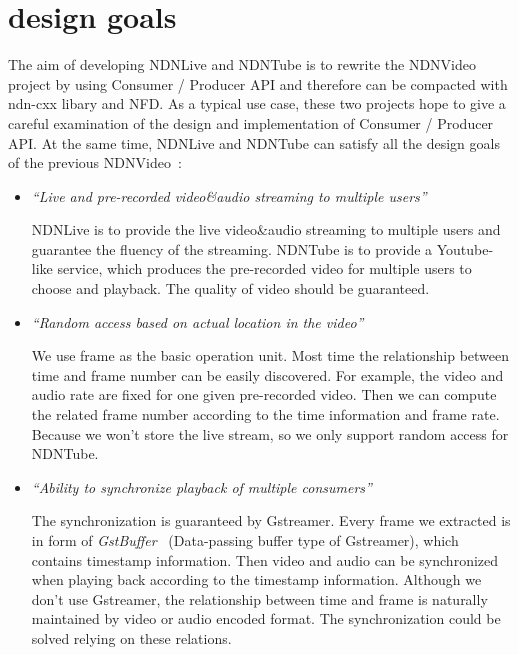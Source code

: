 \vspace{0.3cm}
\section{design goals} %
\label{sec:design_goals}
The aim of developing NDNLive and NDNTube is to rewrite the NDNVideo project by using Consumer / Producer API and therefore can be compacted with ndn-cxx libary\cite{ndn-cxx} and NFD\cite{nfd-guide}. As a typical use case, these two projects hope to give a careful examination of the design and implementation of Consumer / Producer API. At the same time, NDNLive and NDNTube can satisfy all the design goals of the previous NDNVideo~\cite{ndnvideo}:

\begin{itemize}
\item{\textit{``Live and pre-recorded video\&audio streaming to multiple users''}}

NDNLive is to provide the live video\&audio streaming to multiple users and guarantee the fluency of the streaming. NDNTube is to provide a Youtube-like service, which produces the pre-recorded video for multiple users to choose and playback. The quality of video should be guaranteed.

\item{\textit{``Random access based on actual location in the video''}}

We use frame as the basic operation unit. Most time the relationship between time and frame number can be easily discovered. For example, the video and audio rate are fixed for one given pre-recorded video. Then we can compute the related frame number according to the time information and frame rate. Because we won't store the live stream, so we only support random access for NDNTube.

\item{\textit{``Ability to synchronize playback of multiple consumers''}}

The synchronization is guaranteed by Gstreamer. Every frame we extracted is in form of \textit{GstBuffer}~\cite{Gstbuffer} (Data-passing buffer type of Gstreamer), which contains timestamp information. Then video and audio can be synchronized when playing back according to the timestamp information. Although we don't use Gstreamer, the relationship between time and frame is naturally maintained by video or audio encoded format. The synchronization could be solved relying on these relations.


\end{itemize}
